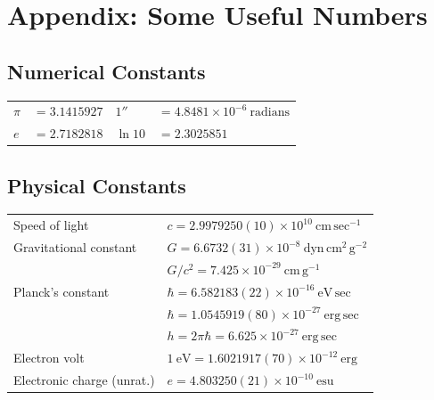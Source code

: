 
\clearpage
\begingroup
\renewcommand{\thefootnote}{*}
\section*{Appendix: Some Useful Numbers%
  \texorpdfstring{\protect\footnotemark}{*}}

\subsection*{Numerical Constants}

\begin{center}
\begin{tabular}{@{}ll@{\qquad}ll@{}}
\(\pi\) & \(=3.1415927\) &
\(1''\) & \(=4.8481\times10^{-6}\ \mathrm{radians}\)\\
\(e\) & \(=2.7182818\) &
\(\ln 10\) & \(=2.3025851\)
\end{tabular}
\end{center}

\subsection*{Physical Constants}

\begingroup
\footnotesize
\renewcommand{\arraystretch}{1.16}
\begin{center}
\begin{tabular}{@{}p{}p{}@{}}
Speed of light &
  \(c=2.9979250(10)\times10^{10}\ \mathrm{cm\,sec^{-1}}\)\\
Gravitational constant &
  \(G=6.6732(31)\times10^{-8}\ \mathrm{dyn\,cm^2\,g^{-2}}\)\\
&
  \(G/c^2=7.425\times10^{-29}\ \mathrm{cm\,g^{-1}}\)\\
Planck's constant &
  \(\hbar=6.582183(22)\times10^{-16}\ \mathrm{eV\,sec}\)\\
&
  \(\hbar=1.0545919(80)\times10^{-27}\ \mathrm{erg\,sec}\)\\
&
  \(h=2\pi\hbar=6.625\times10^{-27}\ \mathrm{erg\,sec}\)\\
Electron volt &
  \(1\ \mathrm{eV}=1.6021917(70)\times10^{-12}\ \mathrm{erg}\)\\
Electronic charge (unrat.) &
  \(e=4.803250(21)\times10^{-10}\ \mathrm{esu}\)
\end{tabular}
\end{center}
\endgroup

